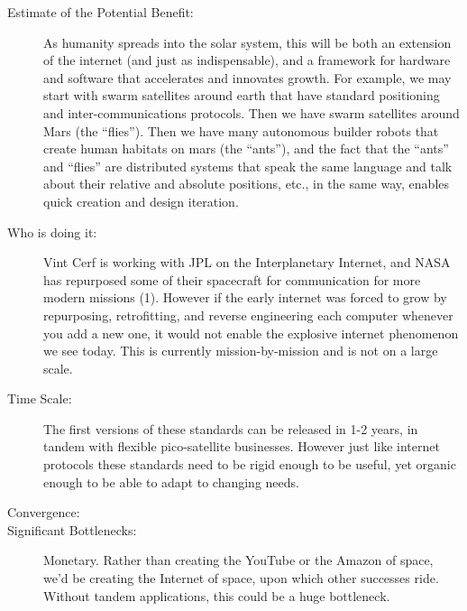 \begin{description}
\item[Estimate of the Potential Benefit:] As humanity spreads into the solar system, this will be both   an extension of the internet (and just as indispensable), and a   framework for hardware and software that accelerates and innovates   growth. For example, we may start with swarm satellites around earth   that have standard positioning and inter-communications protocols. Then   we have swarm satellites around Mars (the ``flies''). Then we have many   autonomous builder robots that create human habitats on mars (the   ``ants''), and the fact that the ``ants'' and ``flies'' are distributed  systems that speak the same language and talk about their relative and   absolute positions, etc., in the same way, enables quick creation and   design iteration.
 
\item[Who is doing it:]
Vint Cerf is working with \gls{JPL} on   the Interplanetary Internet, and NASA has repurposed some of their  spacecraft for communication for more modern missions (1). However if   the early internet was forced to grow by repurposing, retrofitting, and   reverse engineering each computer whenever you add a new one, it would   not enable the explosive internet phenomenon we see today. This is   currently mission-by-mission and is not on a large scale.
 
\item[Time Scale:] The first  versions of these standards can be released in 1-2 years, in tandem  with  flexible pico-satellite businesses. However just like internet   protocols these standards need to be rigid enough to be useful, yet   organic enough to be able to adapt to changing needs.
 
\item[Convergence:] 
 
\item[Significant Bottlenecks:]   Monetary. Rather than creating the YouTube or the Amazon of space, we'd   be creating the Internet of space, upon which other successes ride.   Without tandem applications, this could be a huge bottleneck.
 
\cite{ipsnig}
\end{description}

 
